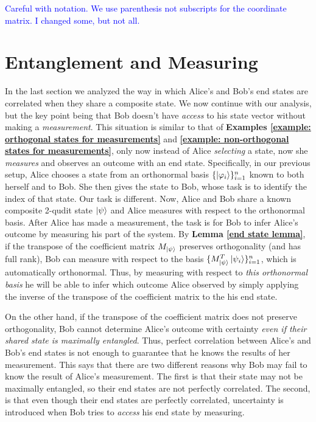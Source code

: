 \textcolor{blue}{Careful with notation.  We use parenthesis not subscripts for the coordinate matrix.  I changed some, but not all.}
\section{Entanglement and Measuring}
In the last section we analyzed the way in which Alice's and Bob's end states are correlated when they share a composite state. We now continue with our analysis, but the key point being that Bob doesn't have {\emph{access}} to his state vector without making a  {\emph{measurement}}.  This situation is similar to that of \textbf{Examples \ref{example: orthogonal states for measurements}} and \textbf{\ref{example: non-orthogonal states for measurements}}, only now instead of Alice {\emph{selecting}} a state, now she {\emph{measures}} and observes an outcome with an end state.  Specifically, in our previous setup, Alice chooses a state from an orthonormal basis $\{\ket{\varphi_i}\}_{i=1}^n$ known to both herself and to Bob. She then gives the state to Bob, whose task is to identify the index of that state. Our task is different. Now, Alice and Bob share a known composite 2-qudit state $\ket{\psi}$ and Alice measures with respect to the orthonormal basis. After Alice has made a measurement, the task is for Bob to infer Alice's outcome by measuring his part of the system. By \textbf{Lemma \ref{end state lemma}}, if the transpose of the coefficient matrix $M_{\ket{\psi}}$ preserves orthogonality (and has full rank), Bob can measure with respect to the basis $\{M_{\ket{\psi}}^T \ket{\psi_i}\}_{i=1}^n$, which is automatically orthonormal. Thus, by measuring with respect to {\emph{this orthonormal basis}} he will be able to infer which outcome Alice observed by simply applying the inverse of the transpose of the coefficient matrix to the his end state. 

On the other hand, if the transpose of the coefficient matrix does not preserve orthogonality, Bob cannot determine Alice's outcome with certainty {\emph{even if their shared state is maximally entangled}}.  Thus, perfect correlation between Alice's and Bob's end states is not enough to guarantee that he knows the results of her measurement.  This says that there are two different reasons why  Bob may fail to know the result of Alice's measurement.  The first is that their state may not be maximally entangled, so their end states are not perfectly correlated.  The second, is that even though their end states are perfectly correlated, uncertainty is introduced when Bob tries to {\emph{access}} his end state by measuring.  

